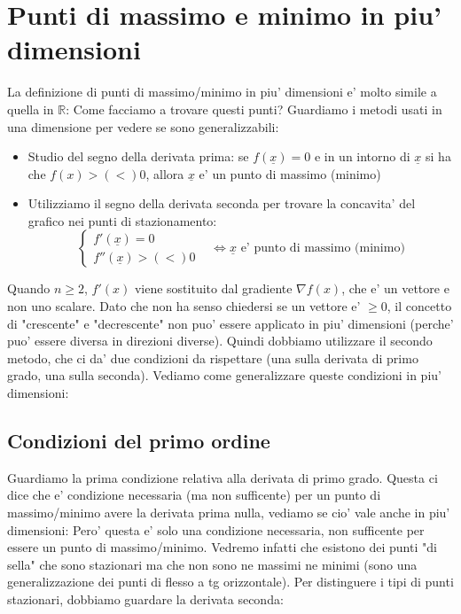 \documentclass{report}
\begin{document}
\section{Punti di massimo e minimo in piu' dimensioni}
La definizione di punti di massimo/minimo in piu' dimensioni e' molto simile a quella in $ \mathbb{R} $:
Come facciamo a trovare questi punti? Guardiamo i metodi usati in una dimensione per vedere se sono generalizzabili:
\begin{itemize}
  \item Studio del segno della derivata prima: se $ f(\underline{x}) = 0 $ e in un intorno di $ \underline{x} $ si ha che $ f(x) > (<) 0 $, allora $ \underline{x} $ e' un punto di massimo (minimo)
  \item Utilizziamo il segno della derivata seconda per trovare la concavita' del grafico nei punti di stazionamento:
    \[
    \begin{cases}
      f'(\underline{x}) = 0& \\
      f''(\underline{x}) > (<) 0 & 
    \end{cases} \iff \underline{x} \text{ e' punto di massimo (minimo)} 
    \]
\end{itemize}
Quando $ n \geq 2 $, $ f'(x) $ viene sostituito dal gradiente $ \nabla f(x) $, che e' un vettore e non uno scalare. Dato che non ha senso chiedersi se un vettore e' $ \geq 0 $,  il concetto di "crescente" e "decrescente" non puo' essere applicato in piu' dimensioni (perche' puo' essere diversa in direzioni diverse). Quindi dobbiamo utilizzare il secondo metodo, che ci da' due condizioni da rispettare (una sulla derivata di primo grado, una sulla seconda). Vediamo come generalizzare queste condizioni in piu' dimensioni:
\subsection{Condizioni del primo ordine}
Guardiamo la prima condizione relativa alla derivata di primo grado. Questa ci dice che e' condizione necessaria (ma non sufficente) per un punto di massimo/minimo avere la derivata prima nulla, vediamo se cio' vale anche in piu' dimensioni:
Pero' questa e' solo una condizione necessaria, non sufficente per essere un punto di massimo/minimo. Vedremo infatti che esistono dei punti "di sella" che sono stazionari ma che non sono ne massimi ne minimi (sono una generalizzazione dei punti di flesso a tg orizzontale). Per distinguere i tipi di punti stazionari, dobbiamo guardare la derivata seconda:
\end{document}
